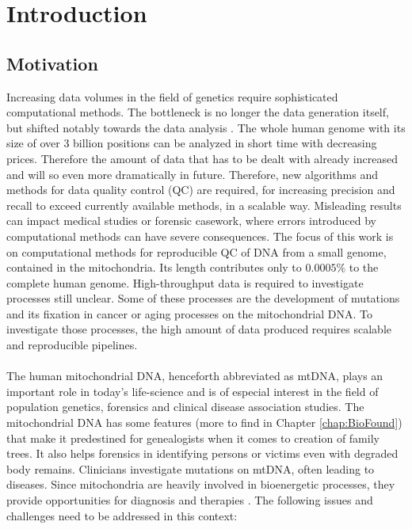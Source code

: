 \chapter{Introduction}
\label{chapterIntro}
\section{Motivation}
Increasing data volumes in the field of genetics require sophisticated computational methods. The bottleneck is no longer the data generation itself, but shifted notably towards the data analysis \cite{Forer2016}. The whole human genome with its size of over 3 billion positions can be analyzed in short time with decreasing prices. Therefore the amount of data that has to be dealt with already increased and will so even more dramatically in future. Therefore, new algorithms and methods for data quality control (QC) are required, for increasing precision and recall to exceed currently available methods, in a scalable way. Misleading results can impact medical studies or forensic casework, where errors introduced by computational methods can have severe consequences. The focus of this work is on computational methods for reproducible QC of DNA from a small genome, contained in the mitochondria. Its length contributes only to $0.0005\%$ to the complete human genome. High-throughput data is required to investigate processes still unclear. Some of these processes are the development of mutations and its fixation in cancer or aging processes on the mitochondrial DNA. To investigate those processes, the high amount of data produced   requires scalable and reproducible pipelines. 
\\
\\
The human mitochondrial DNA, henceforth abbreviated as mtDNA, plays an important role in today's life-science and is of especial interest in the field of population genetics, forensics and clinical disease association studies. The mitochondrial DNA has some features (more to find in Chapter \ref{chap:BioFound}) that make it predestined for genealogists when it comes to creation of family trees. It also helps forensics in identifying persons or victims even with degraded body remains. Clinicians investigate mutations on mtDNA, often leading to diseases. Since mitochondria are heavily involved in bioenergetic processes, they provide opportunities for diagnosis and therapies \cite{Picard2016}.
The following issues and challenges need to be addressed in this context:
